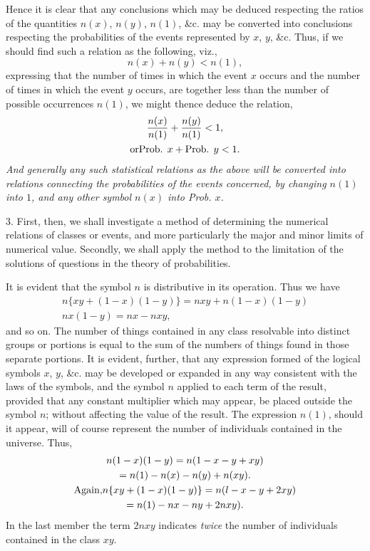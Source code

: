 \documentclass[oneside]{book}
\begin{document}
Hence it is clear that any conclusions which may be deduced
respecting the ratios of the quantities $n(x)$, $n(y)$, $n(1)$, \&c. may
be converted into conclusions respecting the probabilities of the
events represented by $x$, $y$, \&c. Thus, if we should find such a
relation as the following, viz.,
\[
n(x) + n(y) < n(1),
\]
expressing that the number of times in which the event $x$ occurs
and the number of times in which the event $y$ occurs, are together
less than the number of possible occurrences $n(1)$, we might
thence deduce the relation,
\begin{gather*}
  \frac{n(x)}{n(1)} + \frac{n(y)}{n(1)} < 1,
\\
  \text{or}\hfill \text{Prob. } x + \text{Prob. } y < 1. \hfill
\end{gather*}
\emph{
And generally any such statistical relations as the above will be
converted into relations connecting the probabilities of the events
concerned, by changing $n(1)$ into $1$, and any other symbol $n(x)$
into Prob. $x$.}

3. First, then, we shall investigate a method of determining
the numerical relations of classes or events, and more particularly
the major and minor limits of numerical value. Secondly, we
shall apply the method to the limitation of the solutions of questions
in the theory of probabilities.

It is evident that the symbol $n$ is distributive in its operation.
Thus we have
\begin{gather*}
n\{xy + (1-x)(1-y)\} = nxy + n(1-x)(1-y)\\
nx(1-y) = nx - nxy,
\end{gather*}
and so on. The number of things contained in any class resolvable
into distinct groups or portions is equal to the sum of
the numbers of things found in those separate portions. It is
evident, further, that any expression formed of the logical symbols
$x$, $y$, \&c. may be developed or expanded in any way consistent
with the laws of the symbols, and the symbol $n$ applied to
each term of the result, provided that any constant multiplier
which may appear, be placed outside the symbol $n$; without affecting
the value of the result. The expression $n(1)$, should it appear,
will of course represent the number of individuals contained
in the universe. Thus,
\begin{gather*}
n(1-x)(1-y) = n(1-x-y+xy)\\
= n(1) - n(x) - n(y) + n(xy).\\
\text{Again,} \hfill n\{xy + (1-x)(1-y)\} = n(l-x-y+2xy) \hfill \\
= n(1) - nx - ny + 2nxy).
\end{gather*}
In the last member the term $2nxy$ indicates \emph{twice} the number of
individuals contained in the class $xy$.
\end{document}
